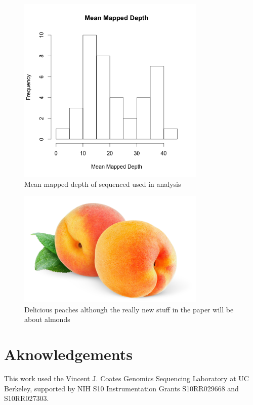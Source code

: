 \documentclass[12pt]{article}
\newcommand{\beginsupplement}{%
        \setcounter{table}{0}
        \renewcommand{\thetable}{S\arabic{table}}%
        \setcounter{figure}{0}
        \renewcommand{\thefigure}{S\arabic{figure}}%
     }
\begin{document}
\pagebreak

%
%
%
\pagebreak
\begin{figure}[b]
\centering
   \includegraphics[width=0.8\textwidth]{depthBQ20MQ30.png}
  \caption{Mean mapped depth of sequenced used in analysis}
  \label{fig:depth}
\end{figure}

\begin{figure}[b]
\centering
   \includegraphics[width=0.8\textwidth]{peachzdfgad.jpg}
  \caption{Delicious peaches although the really new stuff in the paper will be about almonds}
  \label{fig:peach}
\end{figure}
%
\pagebreak
\beginsupplement
\section*{Aknowledgements}
This work used the Vincent J. Coates Genomics Sequencing Laboratory at UC Berkeley, supported by NIH S10 Instrumentation Grants S10RR029668 and S10RR027303.
\end{document}
